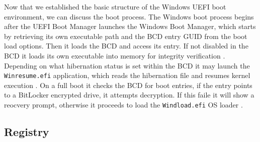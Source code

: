Now that we established the basic structure of the Windows UEFI boot environment, we can discuss the boot process. The Windows boot process begins after the UEFI Boot Manager launches the Windows Boot Manager, which starts by retrieving its own executable path and the \ac{BCD} entry GUID from the boot load options. Then it loads the \ac{BCD} and access its entry. If not disabled in the \ac{BCD} it loads its own executable into memory for integrity verification \cite[12. The Windows Boot Manager]{windows-internals-7-part2}. Depending on what hibernation status is set within the \ac{BCD} it may launch the \lstinline{Winresume.efi} application, which reads the hibernation file and resumes kernel execution \cite[12. Launching a boot application]{windows-internals-7-part2}. On a full boot it checks the \ac{BCD} for boot entries, if the entry points to a BitLocker encrypted drive, it attempts decryption. If this faile it will show a reocvery prompt, otherwise it proceeds to load the \lstinline{Windload.efi} \ac{OS} loader \cite[12. Launching a boot application]{windows-internals-7-part2}.

\cite[12. Launching a boot application]{windows-internals-7-part2}


\subsection{Registry}

